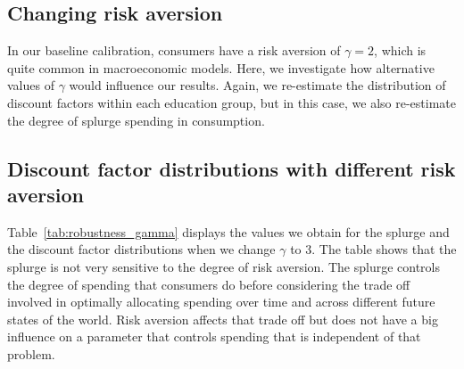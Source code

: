 \documentclass[\latexroot/\projectname]{subfiles}
\begin{document}
\FloatBarrier
\hypertarget{changing-risk-aversion}{}\par\subsection*{Changing risk aversion}
\whenintegrated{\label{sec:robust_gamma}} %

In our baseline calibration, consumers have a risk aversion of $\gamma=2$, which is quite common in macroeconomic models.
Here, we investigate how alternative values of $\gamma$ would influence our results.
Again, we re-estimate the distribution of discount factors within each education group, but in this case, we also re-estimate the degree of splurge spending in consumption.

\subsection*{Discount factor distributions with different risk aversion}
\whenintegrated{\label{sec:robust_gamma_estim}} %

Table~\ref{tab:robustness_gamma} displays the values we obtain for the splurge and the discount factor distributions when we change $\gamma$ to $3$.
The table shows that the splurge is not very sensitive to the degree of risk aversion.
The splurge controls the degree of spending that consumers do before considering the trade off involved in optimally allocating spending over time and across different future states of the world.
Risk aversion affects that trade off but does not have a big influence on a parameter that controls spending that is independent of that problem.
\end{document}
